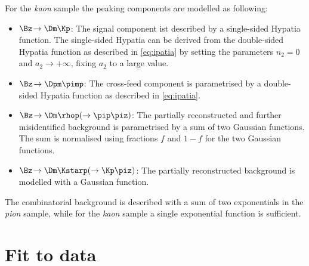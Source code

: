 For the \emph{kaon} sample the peaking components are modelled as following:
\begin{itemize}
	\item $\Bz\!\to\Dm\Kp$: The signal component ist described by a single-sided Hypatia function. The single-sided Hypatia can be derived from the double-sided Hypatia function as described in \cref{eq:ipatia} by setting the parameters $n_2=0$ and $a_2\to+\infty$, \ie fixing $a_2$ to a large value.
	\item $\Bz\!\to\Dpm\pimp$: The cross-feed component is parametrised by a double-sided Hypatia function as described in \cref{eq:ipatia}.
	\item $\Bz\!\to\Dm\rhop\!\left(\to\pip\piz\right)$: The partially reconstructed and further misidentified background is parametrised by a sum of two Gaussian functions. The sum is normalised using fractions $f$ and $1-f$ for the two Gaussian functions.
	\item $\Bz\!\to\Dm\Kstarp\!\left(\to\Kp\piz\right)$: The partially reconstructed background is modelled with a Gaussian function.
\end{itemize}
The combinatorial background is described with a sum of two exponentials in the \emph{pion} sample, while for the \emph{kaon} sample a single exponential function is sufficient.

\section{Fit to data}
\label{sec:MassFitData}

